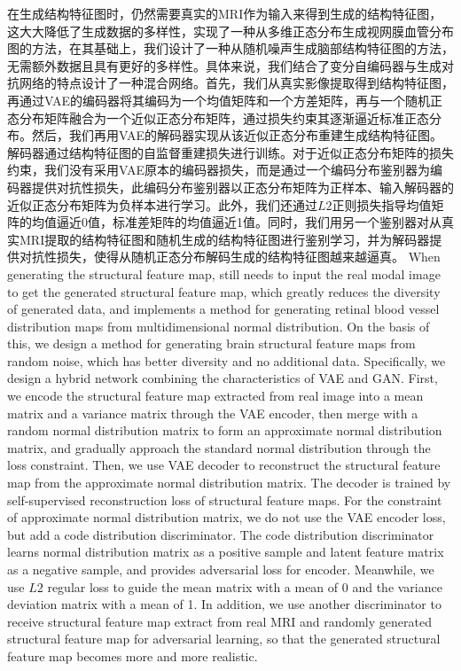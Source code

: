 \documentclass[letterpaper]{article} %
\begin{document}
在生成结构特征图时，\cite{4shin2018medical}仍然需要真实的MRI作为输入来得到生成的结构特征图，这大大降低了生成数据的多样性，\cite{41costa2017towards}实现了一种从多维正态分布生成视网膜血管分布图的方法，在其基础上，我们设计了一种从随机噪声生成脑部结构特征图的方法，无需额外数据且具有更好的多样性。具体来说，我们结合了变分自编码器与生成对抗网络的特点设计了一种混合网络。首先，我们从真实影像提取得到结构特征图，再通过VAE的编码器将其编码为一个均值矩阵和一个方差矩阵，再与一个随机正态分布矩阵融合为一个近似正态分布矩阵，通过损失约束其逐渐逼近标准正态分布。然后，我们再用VAE的解码器实现从该近似正态分布重建生成结构特征图。解码器通过结构特征图的自监督重建损失进行训练。对于近似正态分布矩阵的损失约束，我们没有采用VAE原本的编码器损失，而是通过一个编码分布鉴别器为编码器提供对抗性损失，此编码分布鉴别器以正态分布矩阵为正样本、输入解码器的近似正态分布矩阵为负样本进行学习。此外，我们还通过$L2$正则损失指导均值矩阵的均值逼近0值，标准差矩阵的均值逼近1值。同时，我们用另一个鉴别器对从真实MRI提取的结构特征图和随机生成的结构特征图进行鉴别学习，并为解码器提供对抗性损失，使得从随机正态分布解码生成的结构特征图越来越逼真。
When generating the structural feature map, \cite{4shin2018medical} still needs to input the real modal image to get the generated structural feature map, which greatly reduces the diversity of generated data, and \cite{41costa2017towards} implements a method for generating retinal blood vessel distribution maps from multidimensional normal distribution. On the basis of this, we design a method for generating brain structural feature maps from random noise, which has better diversity and no additional data. 
Specifically, we design a hybrid network combining the characteristics of VAE and GAN. First, we encode the structural feature map extracted from real image into a mean matrix and a variance matrix through the VAE encoder, then merge with a random normal distribution matrix to form an approximate normal distribution matrix, and gradually approach the standard normal distribution through the loss constraint. Then, we use VAE decoder to reconstruct the structural feature map from the approximate normal distribution matrix. The decoder is trained by self-supervised reconstruction loss of structural feature maps. For the constraint of approximate normal distribution matrix, we do not use the VAE encoder loss, but add a code distribution discriminator. The code distribution discriminator learns normal distribution matrix as a positive sample and latent feature matrix as a negative sample, and provides adversarial loss for encoder. Meanwhile, we use $L2$ regular loss to guide the mean matrix with a mean of 0 and the variance deviation matrix with a mean of 1. In addition, we use another discriminator to receive structural feature map extract from real MRI and randomly generated structural feature map for adversarial learning, so that the generated structural feature map becomes more and more realistic.
\end{document}
